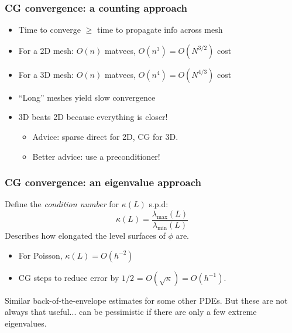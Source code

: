 \documentclass{beamer}
\begin{document}
\begin{frame}
  \frametitle{CG convergence: a counting approach}

  \begin{itemize}
  \item Time to converge $\geq$ time to propagate info across mesh
  \item For a 2D mesh: $O(n)$ matvecs, $O(n^3) = O(N^{3/2})$ cost
  \item For a 3D mesh: $O(n)$ matvecs, $O(n^4) = O(N^{4/3})$ cost
  \item ``Long'' meshes yield slow convergence
  \item 3D beats 2D because everything is closer!
    \begin{itemize}
    \item Advice: sparse direct for 2D, CG for 3D.
    \item Better advice: use a preconditioner!
    \end{itemize}
  \end{itemize}
\end{frame}


\begin{frame}
  \frametitle{CG convergence: an eigenvalue approach}

  Define the {\em condition number} for $\kappa(L)$ s.p.d:
  \[
    \kappa(L) = \frac{\lambda_{\max}(L)}{\lambda_{\min}(L)}
  \]
  Describes how elongated the level surfaces of $\phi$ are.

  \vspace{5mm}
  \begin{itemize}
  \item
    For Poisson, $\kappa(L) = O(h^{-2})$
  \item
    CG steps to reduce error by $1/2$ = 
    $O(\sqrt{\kappa}) = O(h^{-1})$.
  \end{itemize}
  
  \vspace{5mm}
  Similar back-of-the-envelope estimates for some other PDEs.
  But these are not always that useful... can be pessimistic
  if there are only a few extreme eigenvalues.
\end{frame}
\end{document}
